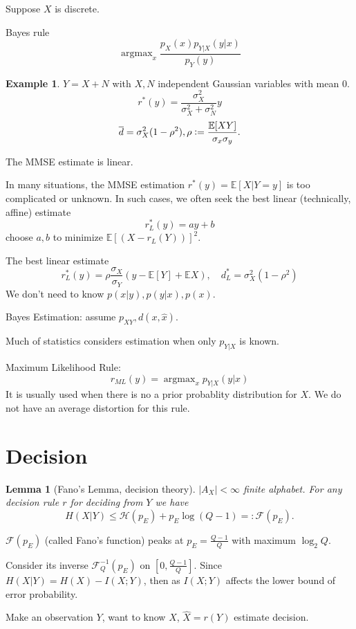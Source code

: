 \documentclass{report}
\newcommand{\matE}{\mathbb{E}}
\DeclareMathOperator*{\argmax}{\arg \max}
\newcommand{\defeq}{\vcentcolon=}
\newcommand{\eqdef}{=\mathrel{\mathop:}}
\newtheorem{lemma}{Lemma}[section]
\theoremstyle{definition}
\newtheorem{example}{Example}[section]
\theoremstyle{remark}
\numberwithin{equation}{section}
\begin{document}
Suppose $X$ is discrete. 

Bayes rule \[\argmax_x \frac{p_X(x)p_{Y|X}(y|x)}{p_Y(y)}\]

\begin{example}
  $Y = X + N$ with $X, N$ independent Gaussian variables with mean $0$.
  \[r^*(y) = \frac{\sigma_X^2}{\sigma_X^2+\sigma_N^2}y\]
  \[\overline{d} = \sigma_X^2(1 - \rho^2), \rho \defeq \frac{\matE[XY]}{\sigma_x\sigma_y}.\]
\end{example}
The MMSE estimate is linear.

In many situations, the MMSE estimation $r^*(y) = \matE[X|Y=y]$ is too complicated or unknown.
In such cases, we often seek the best linear (technically, affine) estimate \[
  r^*_L(y) = ay + b  
\] choose $a, b$ to minimize $\matE[(X - r_L(Y))]^2$.

The best linear estimate \[r^*_L(y) = \rho\frac{\sigma_X}{\sigma_Y}(y - \matE[Y] + \matE{X}), \quad d^*_L = \sigma^2_X(1 - \rho^2)\] We don't need to know $p(x|y), p(y|x), p(x)$.

Bayes Estimation: assume $p_{XY}, d(x, \hat{x})$.

Much of statistics considers estimation when only $p_{Y|X}$ is known.

Maximum Likelihood Rule: 
\[r_{ML}(y) = \argmax_x p_{Y|X}(y|x)\] 
It is usually used when there is no a prior probablity distribution for $X$. We do not have an average distortion for this rule.

\section{Decision}

\begin{lemma}[Fano's Lemma, decision theory]
  $|A_X| < \infty$ finite alphabet. For any decision rule $r$ for deciding from $Y$ we have \[H(X|Y) \leq \mathscr{H}(p_E) + p_E\log(Q - 1) \eqdef \mathscr{F}(p_E).\]
\end{lemma}
$\mathscr{F}(p_E)$ (called Fano's function) peaks at $p_E = \frac{Q-1}{Q}$ with maximum $\log_2Q$.

Consider its inverse $\mathscr{F}^{-1}_Q(p_E)$ on $\left[0, \frac{Q-1}{Q}\right]$. Since $H(X|Y) = H(X) - I(X; Y)$, then as $I(X; Y)$ affects the lower bound of error probability.

Make an observation $Y$, want to know $X$, $\hat{X} = r(Y)$ estimate decision.
\end{document}
